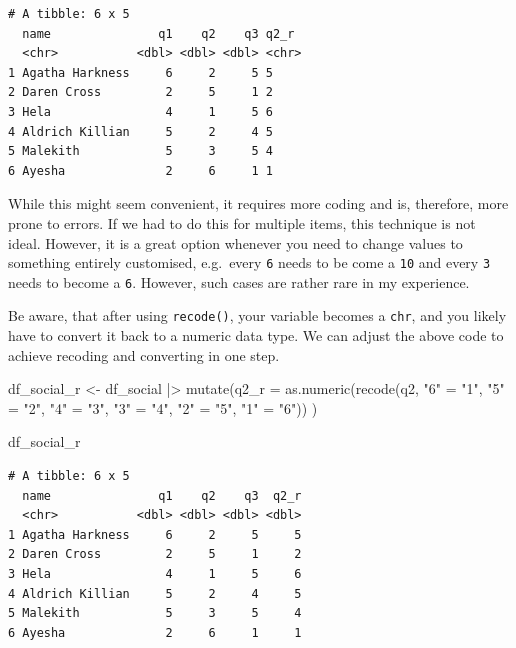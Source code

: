 \documentclass[
  letterpaper,
  DIV=11,
  numbers=noendperiod]{scrreprt}
\newenvironment{Shaded}{\begin{snugshade}}{\end{snugshade}}
\newcommand{\AttributeTok}[1]{\textcolor[rgb]{0.40,0.45,0.13}{#1}}
\newcommand{\FunctionTok}[1]{\textcolor[rgb]{0.28,0.35,0.67}{#1}}
\newcommand{\NormalTok}[1]{\textcolor[rgb]{0.00,0.23,0.31}{#1}}
\newcommand{\OtherTok}[1]{\textcolor[rgb]{0.00,0.23,0.31}{#1}}
\newcommand{\SpecialCharTok}[1]{\textcolor[rgb]{0.37,0.37,0.37}{#1}}
\newcommand{\StringTok}[1]{\textcolor[rgb]{0.13,0.47,0.30}{#1}}
\begin{document}
\begin{verbatim}
# A tibble: 6 x 5
  name               q1    q2    q3 q2_r 
  <chr>           <dbl> <dbl> <dbl> <chr>
1 Agatha Harkness     6     2     5 5    
2 Daren Cross         2     5     1 2    
3 Hela                4     1     5 6    
4 Aldrich Killian     5     2     4 5    
5 Malekith            5     3     5 4    
6 Ayesha              2     6     1 1    
\end{verbatim}

While this might seem convenient, it requires more coding and is,
therefore, more prone to errors. If we had to do this for multiple
items, this technique is not ideal. However, it is a great option
whenever you need to change values to something entirely customised,
e.g.~every \texttt{6} needs to be come a \texttt{10} and every
\texttt{3} needs to become a \texttt{6}. However, such cases are rather
rare in my experience.

Be aware, that after using \texttt{recode()}, your variable becomes a
\texttt{chr}, and you likely have to convert it back to a numeric data
type. We can adjust the above code to achieve recoding and converting in
one step.

\begin{Shaded}
\begin{Highlighting}[]
\NormalTok{df\_social\_r }\OtherTok{\textless{}{-}}
\NormalTok{  df\_social }\SpecialCharTok{|\textgreater{}}
  \FunctionTok{mutate}\NormalTok{(}\AttributeTok{q2\_r =} \FunctionTok{as.numeric}\NormalTok{(}\FunctionTok{recode}\NormalTok{(q2,}
                                  \StringTok{"6"} \OtherTok{=} \StringTok{"1"}\NormalTok{,}
                                  \StringTok{"5"} \OtherTok{=} \StringTok{"2"}\NormalTok{,}
                                  \StringTok{"4"} \OtherTok{=} \StringTok{"3"}\NormalTok{,}
                                  \StringTok{"3"} \OtherTok{=} \StringTok{"4"}\NormalTok{,}
                                  \StringTok{"2"} \OtherTok{=} \StringTok{"5"}\NormalTok{,}
                                  \StringTok{"1"} \OtherTok{=} \StringTok{"6"}\NormalTok{))}
\NormalTok{  )}

\NormalTok{df\_social\_r}
\end{Highlighting}
\end{Shaded}

\begin{verbatim}
# A tibble: 6 x 5
  name               q1    q2    q3  q2_r
  <chr>           <dbl> <dbl> <dbl> <dbl>
1 Agatha Harkness     6     2     5     5
2 Daren Cross         2     5     1     2
3 Hela                4     1     5     6
4 Aldrich Killian     5     2     4     5
5 Malekith            5     3     5     4
6 Ayesha              2     6     1     1
\end{verbatim}
\end{document}
